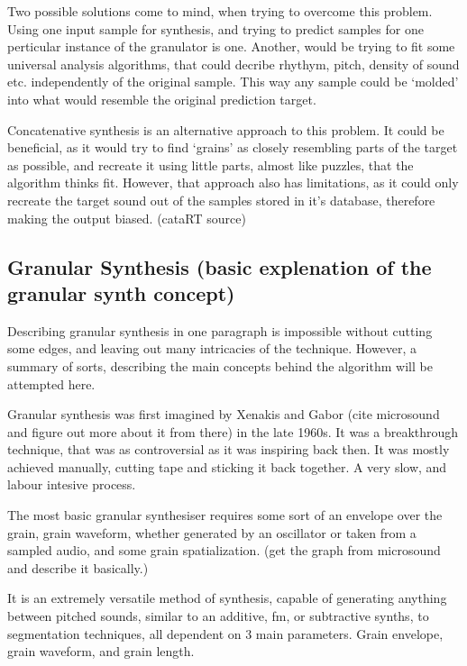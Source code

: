 Two possible solutions come to mind, when trying to overcome this
problem. Using one input sample for synthesis, and trying
to predict samples for one perticular instance of the granulator is one.
Another, would be trying to fit some universal analysis algorithms,
that could decribe rhythym, pitch, density of sound etc. independently
of the original sample. This way any sample could be `molded' into
what would resemble the original prediction target. 

Concatenative synthesis is an alternative approach to this problem. It
could be beneficial, as it would try to find `grains' as closely
resembling parts of the target as possible, and recreate it using
little parts, almost like puzzles, that the algorithm thinks
fit. However, that approach also has limitations, as it could only
recreate the target sound out of the samples stored in it's database,
therefore making the output biased. (cataRT source)
%
\subsection{Granular Synthesis (basic explenation of the granular synth concept)}

Describing granular synthesis in one paragraph is impossible
without cutting some edges, and leaving out many intricacies of the
technique. However, a summary of sorts, describing the main concepts
behind the algorithm will be attempted here. 

Granular synthesis was first imagined by Xenakis and Gabor (cite
microsound and figure out more about it from there) in the late
1960s. It was a breakthrough technique, that was as controversial as
it was inspiring back then. It was mostly achieved manually, cutting
tape and sticking it back together. A very slow, and labour intesive
process.

The most basic granular synthesiser requires some sort of an envelope
over the grain, grain waveform, whether generated by an oscillator or
taken from a sampled audio, and some grain spatialization. (get the
graph from microsound and describe it basically.) 

It is an extremely versatile method of synthesis, capable of
generating anything between pitched sounds, similar to an additive,
fm, or subtractive synths, to segmentation techniques, all dependent
on 3 main parameters. Grain envelope, grain waveform, and grain
length.



